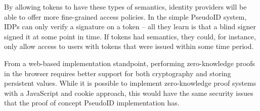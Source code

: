 \documentclass{llncs}
\begin{document}
By allowing tokens to have these types of semantics, identity
providers will be able to offer more fine-grained access policies. In
the simple PseudoID system, IDPs can only verify a signature on a
token -- all they learn is that a blind signer signed it at some point
in time. If tokens had semantics, they could, for instance, only allow
access to users with tokens that were issued within some time period.

From a web-based implementation standpoint, performing zero-knowledge
proofs in the browser requires better support for both cryptography
and storing persistent values. While it is possible to implement
zero-knowledge proof systems with a JavaScript and cookie approach,
this would have the same security issues that the proof of concept
PseudoID implementation has.



\end{document}
